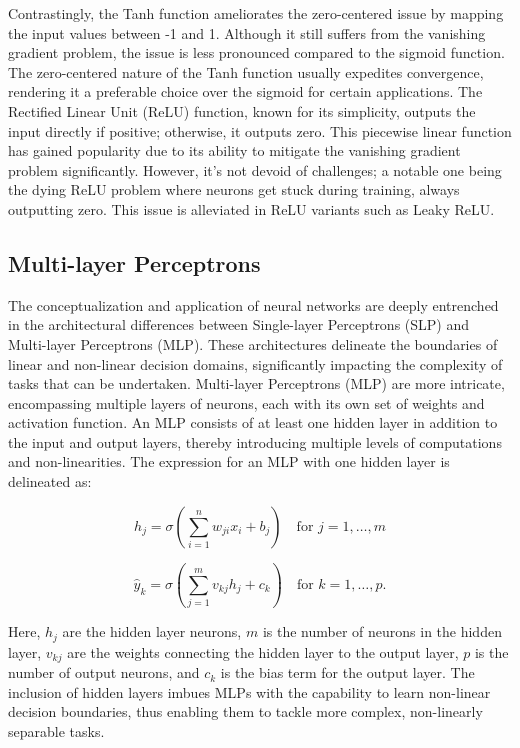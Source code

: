 \documentclass[10pt,twocolumn,letterpaper]{article}
\begin{document}
Contrastingly, the Tanh function ameliorates the zero-centered issue by mapping the input values between -1 and 1. Although it still suffers from the vanishing gradient problem, the issue is less pronounced compared to the sigmoid function. The zero-centered nature of the Tanh function usually expedites convergence, rendering it a preferable choice over the sigmoid for certain applications. The Rectified Linear Unit (ReLU) function, known for its simplicity, outputs the input directly if positive; otherwise, it outputs zero. This piecewise linear function has gained popularity due to its ability to mitigate the vanishing gradient problem significantly. However, it's not devoid of challenges; a notable one being the dying ReLU problem where neurons get stuck during training, always outputting zero. This issue is alleviated in ReLU variants such as Leaky ReLU.

\subsection{Multi-layer Perceptrons}

The conceptualization and application of neural networks are deeply entrenched in the architectural differences between Single-layer Perceptrons (SLP) and Multi-layer Perceptrons (MLP). These architectures delineate the boundaries of linear and non-linear decision domains, significantly impacting the complexity of tasks that can be undertaken. Multi-layer Perceptrons (MLP) are more intricate, encompassing multiple layers of neurons, each with its own set of weights and activation function. An MLP consists of at least one hidden layer in addition to the input and output layers, thereby introducing multiple levels of computations and non-linearities. The expression for an MLP with one hidden layer is delineated as:

\[
   h_j = \sigma \left( \sum_{i=1}^{n} w_{ji} x_i + b_j \right) \quad \text{for } j = 1, \ldots, m
\]

\[
   \hat{y}_k = \sigma \left( \sum_{j=1}^{m} v_{kj} h_j + c_k \right) \quad \text{for } k = 1, \ldots, p.
\]

Here, $h_j$ are the hidden layer neurons, $m$ is the number of neurons in the hidden layer, $v_{kj}$ are the weights connecting the hidden layer to the output layer, $p$ is the number of output neurons, and $c_k$ is the bias term for the output layer. The inclusion of hidden layers imbues MLPs with the capability to learn non-linear decision boundaries, thus enabling them to tackle more complex, non-linearly separable tasks.
\end{document}
